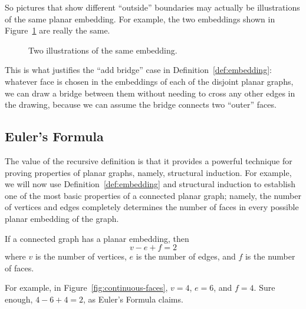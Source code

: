 So pictures that show different ``outside'' boundaries may actually be
illustrations of the same planar embedding.  For example, the two
embeddings shown in Figure~\ref{fig:5DE} are really the same.

\begin{figure}


\caption{Two illustrations of the same embedding.}
\label{fig:5DE}
\end{figure}

This is what justifies the ``add bridge'' case in
Definition~\ref{def:embedding}: whatever face is chosen in the
embeddings of each of the disjoint planar graphs, we can draw a
bridge between them without needing to cross any other edges in the
drawing, because we can assume the bridge connects two ``outer''
faces.

\subsection{Euler's Formula}

The value of the recursive definition is that it provides a powerful
technique for proving properties of planar graphs, namely, structural
induction.  For example, we will now use
Definition~\ref{def:embedding} and structural induction to establish
one of the most basic properties of a connected planar graph; namely,
the number of vertices and edges completely determines the number of
faces in every possible planar embedding of the graph.

\begin{theorem}\label{thm:eulers_formula}
If a connected graph has a planar embedding, then
\begin{equation*}
    v - e + f = 2
\end{equation*}
where $v$ is the number of vertices, $e$ is the number of edges, and
$f$ is the number of faces.
\end{theorem}

For example, in Figure~\ref{fig:continuous-faces}, $v = 4$,
$e = 6$, and $f = 4$.  Sure enough, $4 - 6 + 4 = 2$, as Euler's
Formula claims.

